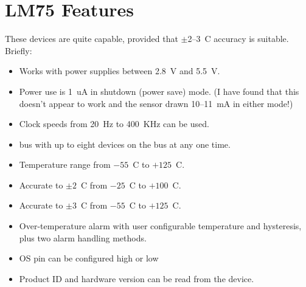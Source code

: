 \section{LM75 Features}

These devices are quite capable, provided that $\pm$2--3\textdegree{}~C accuracy is suitable. Briefly:

\begin{itemize}
    \item Works with power supplies between 2.8~V and 5.5~V.
    \item Power use is 1~uA in shutdown (power save) mode. (I have found that this doesn't appear to work and the sensor drawn 10--11~mA in either mode!)
    \item Clock speeds from 20~Hz to 400~KHz can be used.
    \item \twi{} bus with up to eight devices on the bus at any one time.
    \item Temperature range from $-55$\textdegree{}~C to $+125$\textdegree{}~C.
    \item Accurate to $\pm2$\textdegree{}~C from $-25$\textdegree{}~C to $+100$\textdegree{}~C.
    \item Accurate to $\pm3$\textdegree{}~C from $-55$\textdegree{}~C to $+125$\textdegree{}~C.
    \item Over-temperature alarm with user configurable temperature and hysteresis, plus two alarm handling methods.
    \item OS pin can be configured high or low
    \item Product ID and hardware version can be read from the device.
\end{itemize}